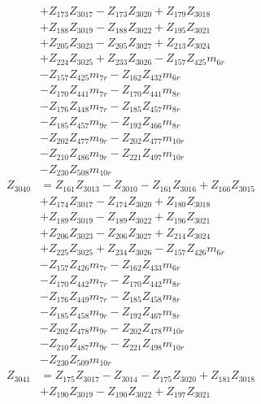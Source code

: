 \begin{multicols}{2}
\begin{align}
&+ Z_{173}Z_{3017} - Z_{173}Z_{3020} + Z_{179}Z_{3018}  \nonumber \\
&+ Z_{188}Z_{3019} - Z_{188}Z_{3022} + Z_{195}Z_{3021}  \nonumber \\
&+ Z_{205}Z_{3023} - Z_{205}Z_{3027} + Z_{213}Z_{3024}  \nonumber \\
&+ Z_{224}Z_{3025} + Z_{233}Z_{3026} - Z_{157}Z_{425}m_{6r}  \nonumber \\
&- Z_{157}Z_{425}m_{7r} - Z_{162}Z_{432}m_{6r}  \nonumber \\
&- Z_{170}Z_{441}m_{7r} - Z_{170}Z_{441}m_{8r}  \nonumber \\
&- Z_{176}Z_{448}m_{7r} - Z_{185}Z_{457}m_{8r}  \nonumber \\
&- Z_{185}Z_{457}m_{9r} - Z_{192}Z_{466}m_{8r}  \nonumber \\
&- Z_{202}Z_{477}m_{9r} - Z_{202}Z_{477}m_{10r}  \nonumber \\
&- Z_{210}Z_{486}m_{9r} - Z_{221}Z_{497}m_{10r}  \nonumber \\
&- Z_{230}Z_{508}m_{10r} \nonumber \\
Z_{3040} &= Z_{161}Z_{3013} - Z_{3010} - Z_{161}Z_{3016} + Z_{166}Z_{3015}  \nonumber \\
&+ Z_{174}Z_{3017} - Z_{174}Z_{3020} + Z_{180}Z_{3018}  \nonumber \\
&+ Z_{189}Z_{3019} - Z_{189}Z_{3022} + Z_{196}Z_{3021}  \nonumber \\
&+ Z_{206}Z_{3023} - Z_{206}Z_{3027} + Z_{214}Z_{3024}  \nonumber \\
&+ Z_{225}Z_{3025} + Z_{234}Z_{3026} - Z_{157}Z_{426}m_{6r}  \nonumber \\
&- Z_{157}Z_{426}m_{7r} - Z_{162}Z_{433}m_{6r}  \nonumber \\
&- Z_{170}Z_{442}m_{7r} - Z_{170}Z_{442}m_{8r}  \nonumber \\
&- Z_{176}Z_{449}m_{7r} - Z_{185}Z_{458}m_{8r}  \nonumber \\
&- Z_{185}Z_{458}m_{9r} - Z_{192}Z_{467}m_{8r}  \nonumber \\
&- Z_{202}Z_{478}m_{9r} - Z_{202}Z_{478}m_{10r}  \nonumber \\
&- Z_{210}Z_{487}m_{9r} - Z_{221}Z_{498}m_{10r}  \nonumber \\
&- Z_{230}Z_{509}m_{10r} \nonumber \\
Z_{3041} &= Z_{175}Z_{3017} - Z_{3014} - Z_{175}Z_{3020} + Z_{181}Z_{3018}  \nonumber \\
&+ Z_{190}Z_{3019} - Z_{190}Z_{3022} + Z_{197}Z_{3021}  \nonumber \\

\end{align}
\end{multicols}
